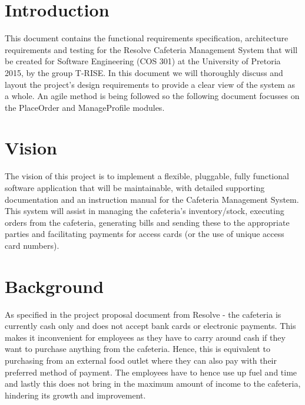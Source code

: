 \documentclass[a4paper,12pt]{article}
\begin{document}
\pagebreak



\section{Introduction}
This document contains the functional requirements specification, architecture requirements and testing for the Resolve Cafeteria Management System that will be created for Software Engineering (COS 301) at the University of Pretoria 2015, by the group T-RISE. In this document we will thoroughly discuss and layout the project's design requirements to provide a clear view of the system as a whole. An agile method is being followed so the following document focusses on the PlaceOrder and ManageProfile modules.

\section{Vision}
The vision of this project is to implement a flexible, pluggable, fully functional software application that will be maintainable, with detailed supporting documentation and an instruction manual for the Cafeteria Management System. This system will assist in managing the cafeteria's inventory/stock, executing orders from the cafeteria, generating bills and sending these to the appropriate parties and facilitating payments for access cards (or the use of unique access card numbers). 

\section{Background}
As specified in the project proposal document from Resolve - the cafeteria is currently cash only and does not accept bank cards or electronic payments. This makes it inconvenient for employees as they have to carry around cash if they want to purchase anything from the cafeteria. Hence, this is equivalent to purchasing from an external food outlet where they can also pay with their preferred method of payment. The employees have to hence use up fuel and time and lastly this does not bring in the maximum amount of income to the cafeteria, hindering its growth and improvement.\\
\end{document}
